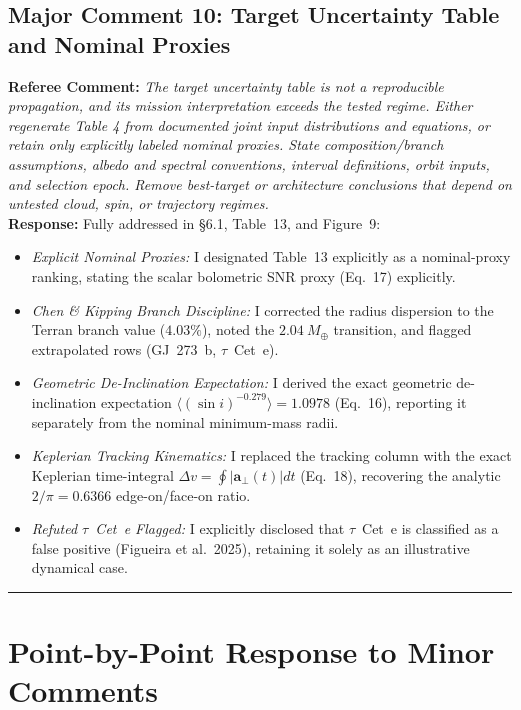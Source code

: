 \documentclass[11pt]{article}
\begin{document}
\subsection*{Major Comment 10: Target Uncertainty Table and Nominal Proxies}
\textbf{Referee Comment:} \textit{The target uncertainty table is not a reproducible propagation, and its mission interpretation exceeds the tested regime. Either regenerate Table 4 from documented joint input distributions and equations, or retain only explicitly labeled nominal proxies. State composition/branch assumptions, albedo and spectral conventions, interval definitions, orbit inputs, and selection epoch. Remove best-target or architecture conclusions that depend on untested cloud, spin, or trajectory regimes.}\\
\textbf{Response:} Fully addressed in §6.1, Table~13, and Figure~9:
\begin{itemize}
    \item \textit{Explicit Nominal Proxies:} I designated Table~13 explicitly as a nominal-proxy ranking, stating the scalar bolometric SNR proxy (Eq.~17) explicitly.
    \item \textit{Chen \& Kipping Branch Discipline:} I corrected the radius dispersion to the Terran branch value ($4.03\%$), noted the $2.04\ M_\oplus$ transition, and flagged extrapolated rows (GJ~273~b, $\tau$~Cet~e).
    \item \textit{Geometric De-Inclination Expectation:} I derived the exact geometric de-inclination expectation $\langle(\sin i)^{-0.279}\rangle = 1.0978$ (Eq.~16), reporting it separately from the nominal minimum-mass radii.
    \item \textit{Keplerian Tracking Kinematics:} I replaced the tracking column with the exact Keplerian time-integral $\Delta v = \oint |\mathbf{a}_\perp(t)| dt$ (Eq.~18), recovering the analytic $2/\pi = 0.6366$ edge-on/face-on ratio.
    \item \textit{Refuted $\tau$~Cet~e Flagged:} I explicitly disclosed that $\tau$~Cet~e is classified as a false positive (Figueira et al.\ 2025), retaining it solely as an illustrative dynamical case.
\end{itemize}

\vspace{3mm}
\hrule
\vspace{3mm}

\section*{Point-by-Point Response to Minor Comments}
\end{document}

